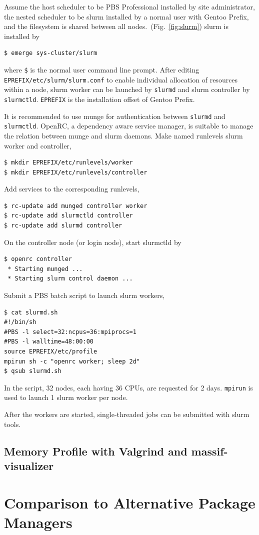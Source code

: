 \documentclass[a4paper,conference]{IEEEtran}
\begin{document}
Assume the host scheduler to be PBS Professional installed by site
administrator, the nested scheduler to be slurm installed by a normal
user with Gentoo Prefix, and the filesystem is shared between all
nodes.~(Fig.~\ref{fig:slurm}) slurm is installed by
\begin{verbatim}
$ emerge sys-cluster/slurm
\end{verbatim}
where \texttt{\$} is the normal user command line prompt.  After editing
\texttt{EPREFIX/etc/slurm/slurm.conf} to enable individual
allocation of resources within a node, slurm worker
can be launched by \texttt{slurmd} and slurm controller by
\texttt{slurmctld}.  \texttt{EPREFIX} is the installation offset of
Gentoo Prefix.

It is recommended to use munge for authentication between
\texttt{slurmd} and \texttt{slurmctld}.  OpenRC, a dependency aware
service manager, is suitable to manage the relation between munge and
slurm daemons.  Make named runlevels slurm worker and controller,
\begin{verbatim}
$ mkdir EPREFIX/etc/runlevels/worker
$ mkdir EPREFIX/etc/runlevels/controller
\end{verbatim}
Add services to the corresponding runlevels,
\begin{verbatim}
$ rc-update add munged controller worker
$ rc-update add slurmctld controller
$ rc-update add slurmd controller
\end{verbatim}
On the controller node (or login node), start slurmctld by
\begin{verbatim}
$ openrc controller
 * Starting munged ...
 * Starting slurm control daemon ...
\end{verbatim}
Submit a PBS batch script to launch slurm workers,
\begin{verbatim}
$ cat slurmd.sh
#!/bin/sh
#PBS -l select=32:ncpus=36:mpiprocs=1
#PBS -l walltime=48:00:00
source EPREFIX/etc/profile
mpirun sh -c "openrc worker; sleep 2d"
$ qsub slurmd.sh
\end{verbatim}
In the script, 32 nodes, each having 36 CPUs, are requested for 2
days. \texttt{mpirun} is used to launch 1 slurm worker per node.

After the workers are started, single-threaded jobs can be submitted
with slurm tools.

\subsection{Memory Profile with Valgrind and massif-visualizer}
\label{sec:massif}

\section{Comparison to Alternative Package Managers}



\end{document}
